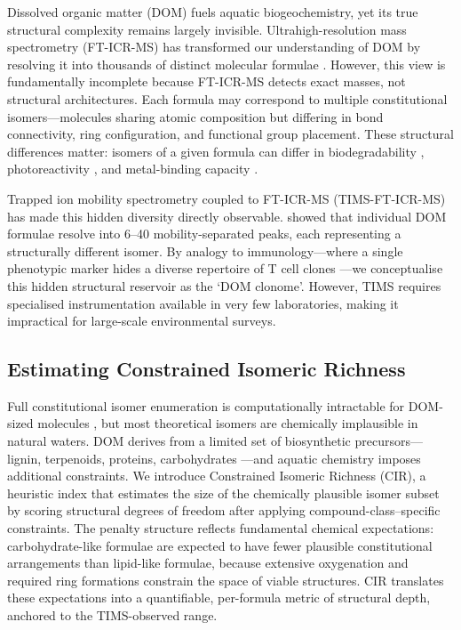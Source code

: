 \documentclass[12pt,letterpaper]{article}
\begin{document}
Dissolved organic matter (DOM) fuels aquatic biogeochemistry, yet its true structural complexity remains largely invisible. Ultrahigh-resolution mass spectrometry (FT-ICR-MS) has transformed our understanding of DOM by resolving it into thousands of distinct molecular formulae \citep{stenson2003,kujawinski2002}. However, this view is fundamentally incomplete because FT-ICR-MS detects exact masses, not structural architectures. Each formula may correspond to multiple constitutional isomers---molecules sharing atomic composition but differing in bond connectivity, ring configuration, and functional group placement. These structural differences matter: isomers of a given formula can differ in biodegradability \citep{ohno2014}, photoreactivity \citep{stubbins2010}, and metal-binding capacity \citep{aiken2011}.

Trapped ion mobility spectrometry coupled to FT-ICR-MS (TIMS-FT-ICR-MS) has made this hidden diversity directly observable. \citet{leyva2019,leyva2020} showed that individual DOM formulae resolve into 6--40 mobility-separated peaks, each representing a structurally different isomer. By analogy to immunology---where a single phenotypic marker hides a diverse repertoire of T cell clones \citep{qi2014}---we conceptualise this hidden structural reservoir as the `DOM clonome'. However, TIMS requires specialised instrumentation available in very few laboratories, making it impractical for large-scale environmental surveys.

\subsection{Estimating Constrained Isomeric Richness}

Full constitutional isomer enumeration is computationally intractable for DOM-sized molecules \citep{benecke1997}, but most theoretical isomers are chemically implausible in natural waters. DOM derives from a limited set of biosynthetic precursors---lignin, terpenoids, proteins, carbohydrates \citep{dittmar2014}---and aquatic chemistry imposes additional constraints. We introduce Constrained Isomeric Richness (CIR), a heuristic index that estimates the size of the chemically plausible isomer subset by scoring structural degrees of freedom after applying compound-class--specific constraints. The penalty structure reflects fundamental chemical expectations: carbohydrate-like formulae are expected to have fewer plausible constitutional arrangements than lipid-like formulae, because extensive oxygenation and required ring formations constrain the space of viable structures. CIR translates these expectations into a quantifiable, per-formula metric of structural depth, anchored to the TIMS-observed range.
\end{document}
